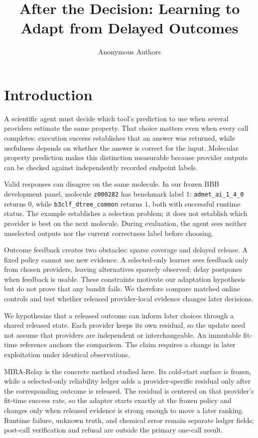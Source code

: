 \documentclass[sigconf,anonymous]{aamas}
\title{After the Decision: Learning to Adapt from Delayed Outcomes}
\author{Anonymous Authors}
\begin{document}
\maketitle

\section{Introduction}
A scientific agent must decide which tool's prediction to use when several providers estimate the same property. That choice matters even when every call completes: execution success establishes that an answer was returned, while usefulness depends on whether the answer is correct for the input. Molecular property prediction makes this distinction measurable because provider outputs can be checked against independently recorded endpoint labels.

Valid responses can disagree on the same molecule. In our frozen BBB development panel, molecule \texttt{z000282} has benchmark label $1$: \texttt{admet\_ai\_1\_4\_0} returns $0$, while \texttt{b3clf\_dtree\_common} returns $1$, both with successful runtime status. The example establishes a selection problem; it does not establish which provider is best on the next molecule. During evaluation, the agent sees neither unselected outputs nor the current correctness label before choosing.

Outcome feedback creates two obstacles: sparse coverage and delayed release. A fixed policy cannot use new evidence. A selected-only learner sees feedback only from chosen providers, leaving alternatives sparsely observed; delay postpones when feedback is usable. These constraints motivate our adaptation hypothesis but do not prove that any bandit fails. We therefore compare matched online controls and test whether released provider-local evidence changes later decisions.

We hypothesize that a released outcome can inform later choices through a shared released state. Each provider keeps its own residual, so the update need not assume that providers are independent or interchangeable. An immutable fit-time reference anchors the comparison. The claim requires a change in later exploitation under identical observations.

MIRA-Relay is the concrete method studied here. Its cold-start surface is frozen, while a selected-only reliability ledger adds a provider-specific residual only after the corresponding outcome is released. The residual is centered on that provider's fit-time success rate, so the adapter starts exactly at the frozen policy and changes only when released evidence is strong enough to move a later ranking. Runtime failure, unknown truth, and chemical error remain separate ledger fields; post-call verification and refusal are outside the primary one-call result.
\end{document}
